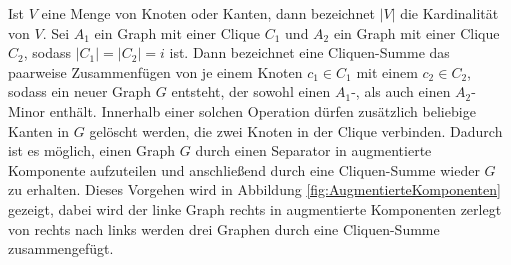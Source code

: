 Ist $V$ eine Menge von Knoten oder Kanten, dann bezeichnet $\vert V \vert$ die Kardinalität von $V$.
Sei $A_1$ ein Graph mit einer Clique $C_1$ und $A_2$ ein Graph mit einer Clique $C_2$, sodass $\vert C_1 \vert = \vert C_2 \vert = i$ ist.
Dann bezeichnet eine Cliquen-Summe das paarweise Zusammenfügen von je einem Knoten $c_1 \in C_1$ mit einem $c_2 \in C_2$, sodass ein neuer Graph $G$ entsteht, der sowohl einen $A_1$-, als auch einen $A_2$-Minor enthält.
Innerhalb einer solchen Operation dürfen zusätzlich beliebige Kanten in $G$ gelöscht werden, die zwei Knoten in der Clique verbinden.
Dadurch ist es möglich, einen Graph $G$ durch einen Separator in augmentierte Komponente aufzuteilen und anschließend durch eine Cliquen-Summe wieder $G$ zu erhalten.
Dieses Vorgehen wird in Abbildung \ref{fig:AugmentierteKomponenten} gezeigt, dabei wird der linke Graph rechts in augmentierte Komponenten zerlegt \bzw von rechts nach links werden drei Graphen durch eine Cliquen-Summe zusammengefügt.
